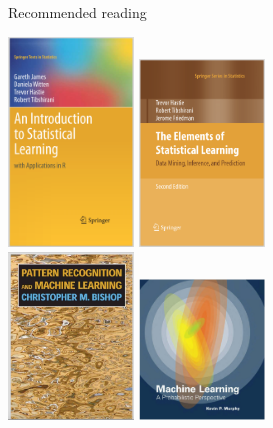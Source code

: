 \documentclass[pdf]{beamer}
\begin{document}
\begin{frame}{Recommended reading}
\begin{center}
	\includegraphics[width=0.25\textwidth, height=0.32\textwidth]{bookJames.png}
	\includegraphics[width=0.25\textwidth, height=0.32\textwidth]{bookHastie.png}\\
	\includegraphics[width=0.25\textwidth, height=0.32\textwidth]{bookBishop.png}
	\includegraphics[width=0.25\textwidth, height=0.32\textwidth]{bookMurphy.png}
\end{center}
\end{frame}
\end{document}
